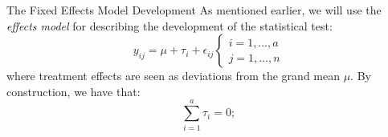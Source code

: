 
\begin{frame}
{The Fixed Effects Model}
{Development}
As mentioned earlier, we will use the \textit{effects model} for describing the development of the statistical test:
\begin{equation*}
y_{ij} = \mu + \tau_i + \epsilon_{ij}\begin{cases}i=1,\ldots,a\\j=1,\ldots,n\end{cases}
\end{equation*}
\noindent where treatment effects are seen as deviations from the grand mean $\mu$.
\bigskip
By construction, we have that:
\begin{equation*}
\sum_{i=1}^{a}\tau_i = 0;
\end{equation*}
\end{frame}

